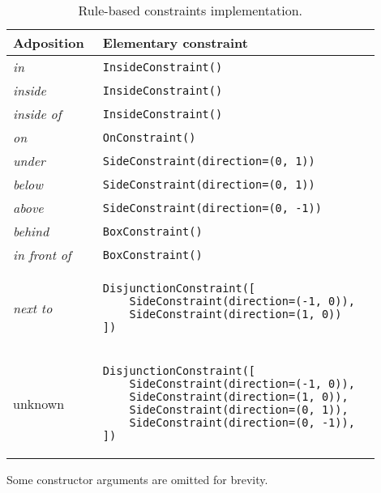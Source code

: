 \begin{table}[ht]
    \small
    \centering
    \begin{threeparttable}
        \begin{tabular}{p{0.2\linewidth}|p{0.7\linewidth}}
            \textbf{Adposition} & \textbf{Elementary constraint} \\
            \hline \hline
            \emph{in}        &  \verb|InsideConstraint()| \\
            \hline
            \emph{inside}    & \verb|InsideConstraint()| \\
            \hline
            \emph{inside of} & \verb|InsideConstraint()| \\
            \hline
            \emph{on}        & \verb|OnConstraint()| \\
            \hline
            \emph{under}    & \verb|SideConstraint(direction=(0, 1))| \\
            \hline
            \emph{below}    & \verb|SideConstraint(direction=(0, 1))| \\
            \hline
            \emph{above}     & \verb|SideConstraint(direction=(0, -1))| \\
            \hline
            \emph{behind}    & \verb|BoxConstraint()| \\
            \hline
            \emph{in front of} & \verb|BoxConstraint()| \\
            \hline
            \emph{next to} & \begin{minipage}[t]{\linewidth}
            \begin{verbatim}
DisjunctionConstraint([
    SideConstraint(direction=(-1, 0)),
    SideConstraint(direction=(1, 0))
])\end{verbatim}
            \end{minipage}\vspace{4pt} \\
            \hline
            unknown & \begin{minipage}[t]{\linewidth}
            \begin{verbatim}
DisjunctionConstraint([
    SideConstraint(direction=(-1, 0)),
    SideConstraint(direction=(1, 0)),
    SideConstraint(direction=(0, 1)),
    SideConstraint(direction=(0, -1)),
])\end{verbatim}
            \end{minipage}\vspace{4pt}
        \end{tabular}
        \begin{tablenotes}
            \small
            \item Some constructor arguments are omitted for brevity.
        \end{tablenotes}
    \end{threeparttable}
    \caption[Rule-based constraints implementation]{Rule-based constraints implementation.}
    \label{tab:rule_based_constraints_impl}
\end{table}